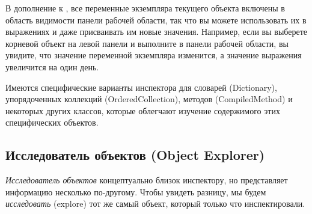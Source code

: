 \documentclass[a4paper,10pt,twoside]{book}
\begin{document}
В дополнение к , все переменные экземпляра текущего объекта включены в область видимости панели рабочей области, так что вы можете использовать их в выражениях и даже присваивать им новые значения. Например, если вы выберете корневой объект на левой панели и выполните  в панели рабочей области, вы увидите, что значение переменной экземпляра  изменится, а значение выражения  увеличится на один день.


Имеются специфические варианты инспектора для словарей (Dictionary), упорядоченных коллекций (OrderedCollection), методов (CompiledMethod) и некоторых других классов, которые облегчают изучение содержимого этих специфических объектов.


\subsection{Исследователь объектов (Object Explorer)}

\emph{Исследователь объектов} концептуально близок инспектору, но представляет информацию несколько по-другому.
Чтобы увидеть разницу, мы будем \emph{исследовать} (explore) тот же самый объект, который только что инспектировали.
\end{document}
